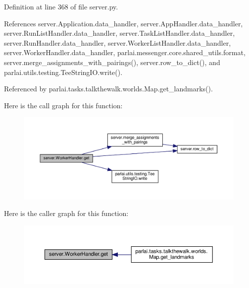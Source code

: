Definition at line 368 of file server.\+py.



References server.\+Application.\+data\+\_\+handler, server.\+App\+Handler.\+data\+\_\+handler, server.\+Run\+List\+Handler.\+data\+\_\+handler, server.\+Task\+List\+Handler.\+data\+\_\+handler, server.\+Run\+Handler.\+data\+\_\+handler, server.\+Worker\+List\+Handler.\+data\+\_\+handler, server.\+Worker\+Handler.\+data\+\_\+handler, parlai.\+messenger.\+core.\+shared\+\_\+utils.\+format, server.\+merge\+\_\+assignments\+\_\+with\+\_\+pairings(), server.\+row\+\_\+to\+\_\+dict(), and parlai.\+utils.\+testing.\+Tee\+String\+I\+O.\+write().



Referenced by parlai.\+tasks.\+talkthewalk.\+worlds.\+Map.\+get\+\_\+landmarks().

Here is the call graph for this function\+:
\nopagebreak
\begin{figure}[H]
\begin{center}
\leavevmode
\includegraphics[width=350pt]{classserver_1_1WorkerHandler_a31d87eeea57f178ecf163cf53a18be93_cgraph}
\end{center}
\end{figure}
Here is the caller graph for this function\+:
\nopagebreak
\begin{figure}[H]
\begin{center}
\leavevmode
\includegraphics[width=350pt]{classserver_1_1WorkerHandler_a31d87eeea57f178ecf163cf53a18be93_icgraph}
\end{center}
\end{figure}
\mbox{\label{classserver_1_1WorkerHandler_ac9a15821c152007d643fc6e8250a1b74}} 
